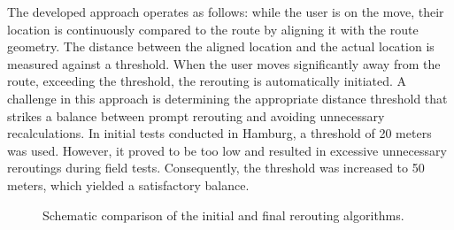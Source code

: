 The developed approach operates as follows: while the user is on the move, their location is continuously compared to the route by aligning it with the route geometry. The distance between the aligned location and the actual location is measured against a threshold. When the user moves significantly away from the route, exceeding the threshold, the rerouting is automatically initiated. A challenge in this approach is determining the appropriate distance threshold that strikes a balance between prompt rerouting and avoiding unnecessary recalculations. In initial tests conducted in Hamburg, a threshold of 20 meters was used. However, it proved to be too low and resulted in excessive unnecessary reroutings during field tests. Consequently, the threshold was increased to 50 meters, which yielded a satisfactory balance.

\begin{figure}[htbp]
\centering
{}
\caption{Schematic comparison of the initial and final rerouting algorithms.}
\label{fig:rerouting-strategy-comparison}
\end{figure}

